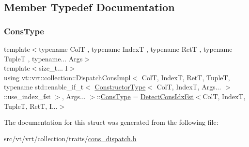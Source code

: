 \subsection{Member Typedef Documentation}
\mbox{\label{structvt_1_1vrt_1_1collection_1_1_dispatch_cons_impl_3_01_col_t_00_01_index_t_00_01_ret_t_00_01_54a52467cad1298e4d5e26941719b8e5_a8ba35d6a9aa9a28e941196fd9c0d015d}} 
\subsubsection{\texorpdfstring{Cons\+Type}{ConsType}}
{\footnotesize\ttfamily template$<$typename ColT , typename IndexT , typename RetT , typename TupleT , typename... Args$>$ \\
template$<$size\+\_\+t... I$>$ \\
using \hyperlink{structvt_1_1vrt_1_1collection_1_1_dispatch_cons_impl}{vt\+::vrt\+::collection\+::\+Dispatch\+Cons\+Impl}$<$ ColT, IndexT, RetT, TupleT, typename std\+::enable\+\_\+if\+\_\+t$<$ \hyperlink{structvt_1_1vrt_1_1collection_1_1_constructor_type}{Constructor\+Type}$<$ ColT, IndexT, Args... $>$\+::use\+\_\+index\+\_\+fst $>$, Args... $>$\+::\hyperlink{structvt_1_1vrt_1_1collection_1_1_dispatch_cons_impl_3_01_col_t_00_01_index_t_00_01_ret_t_00_01_54a52467cad1298e4d5e26941719b8e5_a8ba35d6a9aa9a28e941196fd9c0d015d}{Cons\+Type} =  \hyperlink{structvt_1_1vrt_1_1collection_1_1_detect_cons_idx_fst}{Detect\+Cons\+Idx\+Fst}$<$ColT, IndexT, TupleT, RetT, I...$>$}



The documentation for this struct was generated from the following file\+:\begin{DoxyCompactItemize}
\item 
src/vt/vrt/collection/traits/\hyperlink{cons__dispatch_8h}{cons\+\_\+dispatch.\+h}\end{DoxyCompactItemize}
